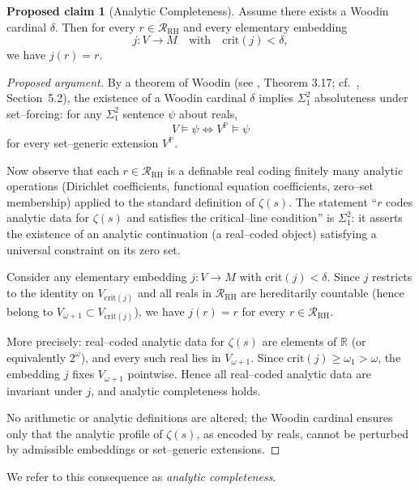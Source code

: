 \documentclass{article}
\theoremstyle{definition}
\newtheorem{proposal}[theorem]{Proposed claim}
\begin{document}
\begin{proposal}[Analytic Completeness]
\label{thm:analytic-completeness}
Assume there exists a Woodin cardinal $\delta$. Then for every
$r \in \mathcal{R}_{\mathrm{RH}}$ and every elementary embedding
\[
j: V \rightarrow M
\quad\text{with}\quad \mathrm{crit}(j) < \delta,
\]
we have $j(r) = r$.
\end{proposal}
\begin{proof}[Proposed argument]
By a theorem of Woodin (see \cite{Woodin1999}, Theorem 3.17;
cf.\ \cite{Larson2004}, Section~5.2), the existence of a Woodin cardinal
$\delta$ implies $\Sigma^2_1$ absoluteness under set--forcing:
for any $\Sigma^2_1$ sentence $\psi$ about reals,
\[
V \models \psi \iff V^{\mathbb{P}} \models \psi
\]
for every set--generic extension $V^{\mathbb{P}}$.

Now observe that each $r \in \mathcal{R}_{\mathrm{RH}}$ is a definable
real coding finitely many analytic operations (Dirichlet coefficients,
functional equation coefficients, zero--set membership) applied to the
standard definition of $\zeta(s)$. The statement ``$r$ codes analytic
data for $\zeta(s)$ and satisfies the critical--line condition'' is
$\Sigma^2_1$: it asserts the existence of an analytic continuation
(a real--coded object) satisfying a universal constraint on its zero set.

Consider any elementary embedding $j: V \to M$ with $\mathrm{crit}(j) < \delta$.
Since $j$ restricts to the identity on $V_{\mathrm{crit}(j)}$ and all reals
in $\mathcal{R}_{\mathrm{RH}}$ are hereditarily countable (hence belong to
$V_{\omega+1} \subset V_{\mathrm{crit}(j)}$), we have $j(r) = r$ for every
$r \in \mathcal{R}_{\mathrm{RH}}$.

More precisely: real--coded analytic data for $\zeta(s)$ are elements of
$\mathbb{R}$ (or equivalently $2^{\omega}$), and every such real lies in
$V_{\omega+1}$. Since $\mathrm{crit}(j) \geq \omega_1 > \omega$,
the embedding $j$ fixes $V_{\omega+1}$ pointwise. Hence all real--coded
analytic data are invariant under $j$, and analytic completeness holds.

No arithmetic or analytic definitions are altered; the Woodin cardinal
ensures only that the analytic profile of $\zeta(s)$, as encoded by reals,
cannot be perturbed by admissible embeddings or set--generic extensions.
\end{proof}

We refer to this consequence as \emph{analytic completeness}.
\end{document}
